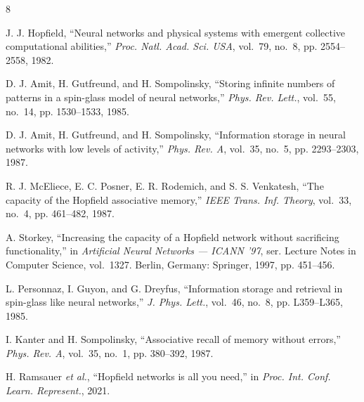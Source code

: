 \begin{thebibliography}{8}

J. J. Hopfield, ``Neural networks and physical systems with emergent collective computational abilities,'' \emph{Proc. Natl. Acad. Sci. USA}, vol.~79, no.~8, pp. 2554--2558, 1982.

D. J. Amit, H. Gutfreund, and H. Sompolinsky, ``Storing infinite numbers of patterns in a spin-glass model of neural networks,'' \emph{Phys. Rev. Lett.}, vol.~55, no.~14, pp. 1530--1533, 1985.

D. J. Amit, H. Gutfreund, and H. Sompolinsky, ``Information storage in neural networks with low levels of activity,'' \emph{Phys. Rev. A}, vol.~35, no.~5, pp. 2293--2303, 1987.

R. J. McEliece, E. C. Posner, E. R. Rodemich, and S. S. Venkatesh, ``The capacity of the Hopfield associative memory,'' \emph{IEEE Trans. Inf. Theory}, vol.~33, no.~4, pp. 461--482, 1987.

A. Storkey, ``Increasing the capacity of a Hopfield network without sacrificing functionality,'' in \emph{Artificial Neural Networks --- ICANN '97}, ser. Lecture Notes in Computer Science, vol.~1327. Berlin, Germany: Springer, 1997, pp. 451--456.

L. Personnaz, I. Guyon, and G. Dreyfus, ``Information storage and retrieval in spin-glass like neural networks,'' \emph{J. Phys. Lett.}, vol.~46, no.~8, pp. L359--L365, 1985.

I. Kanter and H. Sompolinsky, ``Associative recall of memory without errors,'' \emph{Phys. Rev. A}, vol.~35, no.~1, pp. 380--392, 1987.

H. Ramsauer \emph{et al.}, ``Hopfield networks is all you need,'' in \emph{Proc. Int. Conf. Learn. Represent.}, 2021.

\end{thebibliography}
